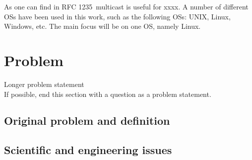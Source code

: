 As one can find in RFC 1235\,\cite{ioannidis_coherent_1991} multicast is useful for xxxx. A number of different \glspl{OS} have been used in this work, such as the following \glspl{OS}: UNIX, Linux, Windows, etc. The main focus will be on one \gls{OS}, namely Linux.

\section{Problem}
\label{sec:problem}

Longer problem statement\\
If possible, end this section with a question as a problem statement.

\subsection{Original problem and definition}
\label{sec:researchQuestion}

\subsection{Scientific and engineering issues}
